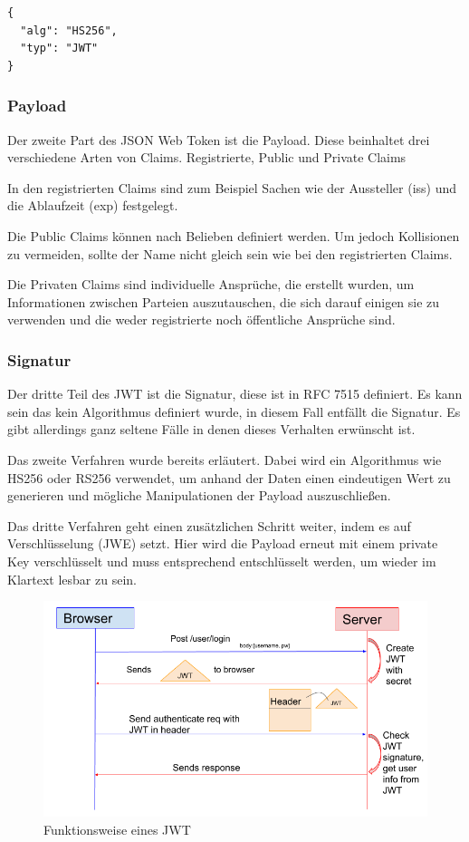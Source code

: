 \begin{lstlisting}
{
  "alg": "HS256",
  "typ": "JWT"
}
\end{lstlisting}

\subsubsection{Payload}
Der zweite Part des JSON Web Token ist die Payload. Diese beinhaltet drei verschiedene Arten von Claims. 
Registrierte, Public und Private Claims

In den registrierten Claims sind zum Beispiel Sachen wie der Aussteller (iss) und die Ablaufzeit (exp) festgelegt.

Die Public Claims können nach Belieben definiert werden. Um jedoch Kollisionen zu vermeiden, sollte der Name nicht gleich sein wie bei den registrierten Claims.

Die Privaten Claims sind individuelle Ansprüche, die erstellt wurden, um Informationen zwischen Parteien auszutauschen, die sich darauf einigen sie zu verwenden und die weder registrierte noch öffentliche Ansprüche sind.


\subsubsection{Signatur}

Der dritte Teil des JWT ist die Signatur, diese ist in RFC 7515 definiert. Es kann sein das kein Algorithmus definiert wurde, in diesem Fall entfällt die Signatur. Es gibt allerdings ganz seltene Fälle in denen dieses Verhalten erwünscht ist. 



Das zweite Verfahren wurde bereits erläutert. Dabei wird ein Algorithmus wie HS256 oder RS256 verwendet, um anhand der Daten einen eindeutigen Wert zu generieren und mögliche Manipulationen der Payload auszuschließen.



Das dritte Verfahren geht einen zusätzlichen Schritt weiter, indem es auf Verschlüsselung (JWE) setzt. Hier wird die Payload erneut mit einem private Key verschlüsselt und muss entsprechend entschlüsselt werden, um wieder im Klartext lesbar zu sein.


\begin{figure}[h!]
    \centering
    \includegraphics[width=0.7\linewidth]{pics/jwt-funktion.png}
    \caption{Funktionsweise eines JWT}
    \label{fig:enter-label}
\end{figure}

